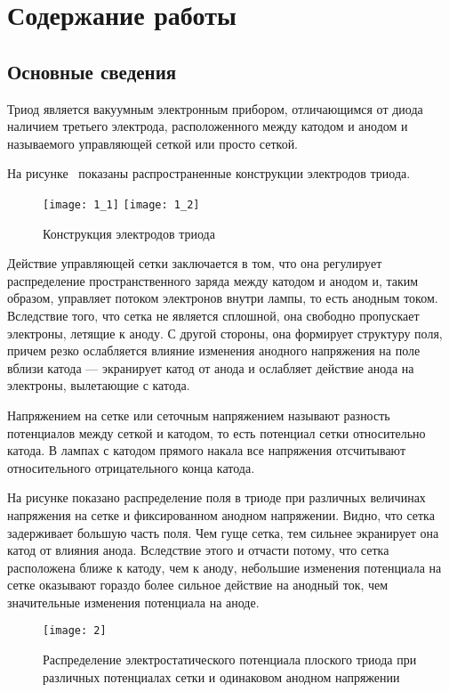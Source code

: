 \section{Содержание работы}

\subsection{Основные сведения}

Триод является вакуумным электронным прибором, отличающимся от диода наличием
третьего электрода, расположенного между катодом и анодом и называемого
управляющей сеткой или просто сеткой.

На рисунке~ показаны распространенные конструкции электродов триода.
\begin{figure}[ht]
  \center
  \texttt{[image: 1\_1]} \hspace{2em}
  \texttt{[image: 1\_2]}
  \caption{Конструкция электродов триода}
  \label{pic1}
\end{figure}

Действие управляющей сетки заключается в том, что она регулирует распределение
пространственного заряда между катодом и анодом и, таким образом, управляет
потоком электронов внутри лампы, то есть анодным током. Вследствие того, что
сетка не является сплошной, она свободно пропускает электроны, летящие к аноду.
С другой стороны, она формирует структуру поля, причем резко ослабляется
влияние изменения анодного напряжения на поле вблизи катода --- экранирует
катод от анода и ослабляет действие анода на электроны, вылетающие с катода.

Напряжением на сетке или сеточным напряжением называют разность потенциалов
между сеткой и катодом, то есть потенциал сетки относительно катода. В лампах
с катодом прямого накала все напряжения отсчитывают относительного
отрицательного конца катода.

На рисунке  показано распределение поля в триоде при различных
величинах напряжения на сетке и фиксированном анодном напряжении. Видно, что
сетка задерживает большую часть поля. Чем гуще сетка, тем сильнее экранирует
она катод от влияния анода. Вследствие этого и отчасти потому, что сетка
расположена ближе к катоду, чем к аноду, небольшие изменения потенциала на
сетке оказывают гораздо более сильное действие на анодный ток, чем значительные
изменения потенциала на аноде.

\begin{figure}[ht]
  \center
  \texttt{[image: 2]}
  \caption{Распределение электростатического потенциала плоского триода при
  различных потенциалах сетки и одинаковом анодном напряжении}
  \label{pic2}
\end{figure}

